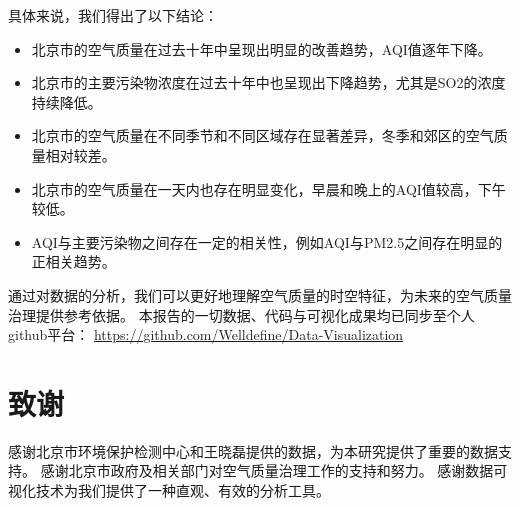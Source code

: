 \documentclass[12pt, a4paper, oneside]{ctexart}
\begin{document}
具体来说，我们得出了以下结论：
\begin{itemize}
    \item 北京市的空气质量在过去十年中呈现出明显的改善趋势，AQI值逐年下降。
    \item 北京市的主要污染物浓度在过去十年中也呈现出下降趋势，尤其是SO2的浓度持续降低。
    \item 北京市的空气质量在不同季节和不同区域存在显著差异，冬季和郊区的空气质量相对较差。
    \item 北京市的空气质量在一天内也存在明显变化，早晨和晚上的AQI值较高，下午较低。
    \item AQI与主要污染物之间存在一定的相关性，例如AQI与PM2.5之间存在明显的正相关趋势。
\end{itemize}
通过对数据的分析，我们可以更好地理解空气质量的时空特征，为未来的空气质量治理提供参考依据。
本报告的一切数据、代码与可视化成果均已同步至个人github平台：
\url{https://github.com/Welldefine/Data-Visualization}
\section{致谢}
感谢北京市环境保护检测中心和王晓磊提供的数据，为本研究提供了重要的数据支持。
感谢北京市政府及相关部门对空气质量治理工作的支持和努力。
感谢数据可视化技术为我们提供了一种直观、有效的分析工具。
\end{document}
